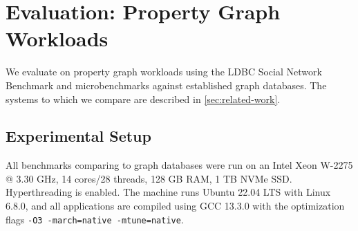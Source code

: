 \chapter{Evaluation: Property Graph Workloads}
\label{sec:eval:property:chapter}

We evaluate \project{} on property graph workloads using the LDBC Social Network Benchmark and microbenchmarks against established graph databases.
The systems to which we compare are described in \autoref{sec:related-work}.

\section{Experimental Setup}
\label{sec:eval:property:setup}

All benchmarks comparing \project{} to graph databases were run on an Intel Xeon W-2275 @ 3.30 GHz, 14 cores/28 threads, 128 GB RAM, 1 TB NVMe SSD.
Hyperthreading is enabled.
The machine runs Ubuntu 22.04 LTS with Linux 6.8.0, and all applications are compiled using GCC 13.3.0 with the optimization flags \texttt{-O3 -march=native -mtune=native}.


